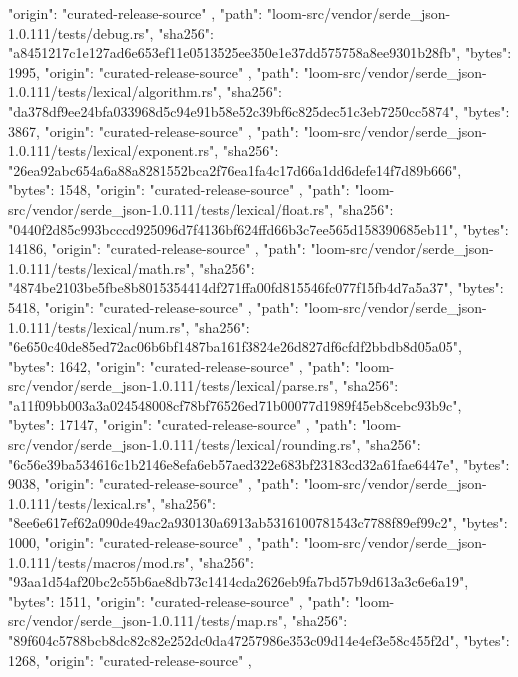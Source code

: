 {{      "origin": "curated-release-source"
    },
    {
      "path": "loom-src/vendor/serde_json-1.0.111/tests/debug.rs",
      "sha256": "a8451217c1e127ad6e653ef11e0513525ee350e1e37dd575758a8ee9301b28fb",
      "bytes": 1995,
      "origin": "curated-release-source"
    },
    {
      "path": "loom-src/vendor/serde_json-1.0.111/tests/lexical/algorithm.rs",
      "sha256": "da378df9ee24bfa033968d5c94e91b58e52c39bf6c825dec51c3eb7250cc5874",
      "bytes": 3867,
      "origin": "curated-release-source"
    },
    {
      "path": "loom-src/vendor/serde_json-1.0.111/tests/lexical/exponent.rs",
      "sha256": "26ea92abc654a6a88a8281552bca2f76ea1fa4c17d66a1dd6defe14f7d89b666",
      "bytes": 1548,
      "origin": "curated-release-source"
    },
    {
      "path": "loom-src/vendor/serde_json-1.0.111/tests/lexical/float.rs",
      "sha256": "0440f2d85c993bcccd925096d7f4136bf624ffd66b3c7ee565d158390685eb11",
      "bytes": 14186,
      "origin": "curated-release-source"
    },
    {
      "path": "loom-src/vendor/serde_json-1.0.111/tests/lexical/math.rs",
      "sha256": "4874be2103be5fbe8b8015354414df271ffa00fd815546fc077f15fb4d7a5a37",
      "bytes": 5418,
      "origin": "curated-release-source"
    },
    {
      "path": "loom-src/vendor/serde_json-1.0.111/tests/lexical/num.rs",
      "sha256": "6e650c40de85ed72ac06b6bf1487ba161f3824e26d827df6cfdf2bbdb8d05a05",
      "bytes": 1642,
      "origin": "curated-release-source"
    },
    {
      "path": "loom-src/vendor/serde_json-1.0.111/tests/lexical/parse.rs",
      "sha256": "a11f09bb003a3a024548008cf78bf76526ed71b00077d1989f45eb8cebc93b9c",
      "bytes": 17147,
      "origin": "curated-release-source"
    },
    {
      "path": "loom-src/vendor/serde_json-1.0.111/tests/lexical/rounding.rs",
      "sha256": "6c56e39ba534616c1b2146e8efa6eb57aed322e683bf23183cd32a61fae6447e",
      "bytes": 9038,
      "origin": "curated-release-source"
    },
    {
      "path": "loom-src/vendor/serde_json-1.0.111/tests/lexical.rs",
      "sha256": "8ee6e617ef62a090de49ac2a930130a6913ab5316100781543c7788f89ef99c2",
      "bytes": 1000,
      "origin": "curated-release-source"
    },
    {
      "path": "loom-src/vendor/serde_json-1.0.111/tests/macros/mod.rs",
      "sha256": "93aa1d54af20bc2c55b6ae8db73c1414cda2626eb9fa7bd57b9d613a3c6e6a19",
      "bytes": 1511,
      "origin": "curated-release-source"
    },
    {
      "path": "loom-src/vendor/serde_json-1.0.111/tests/map.rs",
      "sha256": "89f604c5788bcb8dc82c82e252dc0da47257986e353c09d14e4ef3e58c455f2d",
      "bytes": 1268,
      "origin": "curated-release-source"
    },
}
